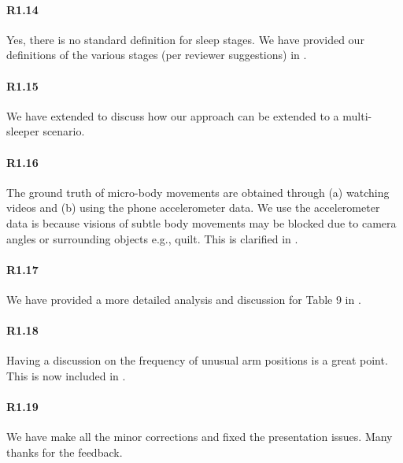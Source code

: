 \paragraph{R1.14} Yes, there is no standard definition for sleep stages. We have provided our definitions of the various stages (per reviewer suggestions) in . 

\paragraph{R1.15} We have extended  to discuss how our approach can be extended to a multi-sleeper scenario.

\paragraph{R1.16} The ground truth of micro-body movements are obtained through (a) watching videos and (b) using the phone accelerometer data. We use the accelerometer data is because visions of subtle body movements may be blocked due to camera angles or surrounding objects e.g., quilt. This is clarified in .

\paragraph{R1.17} We have provided a more detailed analysis and discussion for Table 9 in .

\paragraph{R1.18} Having a discussion on the frequency of unusual arm positions is a great point. This is now included in .

\paragraph{R1.19} We have make all the minor corrections and fixed the presentation issues. Many thanks for the feedback.
